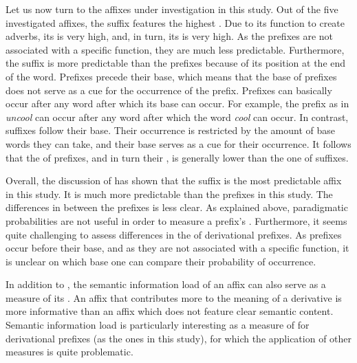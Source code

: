   
Let us now turn to the affixes under investigation in this study. Out of the five investigated affixes, the suffix  features the highest . Due to its function to create adverbs, its  is very high, and, in turn, its  is very high. As the prefixes are not associated with a specific function, they are much less predictable.  
Furthermore, the suffix  is more predictable than the prefixes because of its position at the end of the word. 
 Prefixes precede their base, which means that the base of prefixes does not serve as a cue for the occurrence of the prefix. Prefixes can basically occur after any word after which its base can occur. 
 For example, the prefix  as in \textit{uncool} can occur after any word after which the word \textit{cool} can occur. 
 In contrast, suffixes follow their base. Their occurrence is restricted by the amount of base words they can take,  and their base serves as a cue for their occurrence.
 It follows that the  of prefixes, and in turn their , is generally lower than the one of suffixes. 
 
Overall, the discussion of  has shown that the suffix  is the most predictable affix in this study. It is much more predictable than the prefixes in this study. The differences in  between the prefixes is less clear. As explained above, paradigmatic probabilities are not useful in order to measure a prefix's . Furthermore, it seems quite challenging to assess differences in the  of derivational prefixes. As prefixes occur before their base, and as they are not associated with a specific function, it is unclear on which base one can compare their probability of occurrence.





In addition to , the semantic information load of an affix can also serve as a measure of its . An affix that contributes more to the meaning of a derivative is more informative than an affix which does not feature clear semantic content. Semantic information load is particularly interesting as a measure of  for derivational prefixes (as the ones in this study), for which the application of other  measures is quite problematic. 


